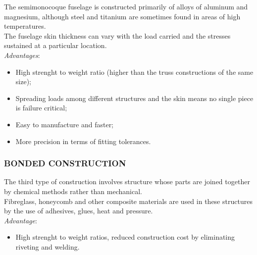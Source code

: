 \noindent 
The semimonocoque fuselage is constructed primarily of alloys of aluminum and magnesium, although steel and titanium are sometimes found in areas of high temperatures. \\ The fuselage skin thickness can vary with the
load carried and the stresses sustained at a particular location. \\

\smallskip
\noindent 
\emph{Advantages}: \begin{itemize}
	\item High strenght to weight ratio (higher than the truss constructions of the same size);
	\item Spreading loads among different structures and
	the skin means no single piece is failure critical;
	\item Easy to manufacture and faster;
	\item More precision in terms of fitting tolerances.
\end{itemize}

\bigskip
\noindent
 \subsubsection*{BONDED CONSTRUCTION}
 
\noindent The third type of construction involves structure whose parts are joined together by chemical methods rather than mechanical.\\ Fibreglass, honeycomb and other composite materials are used in these structures by the use of adhesives, glues, heat and pressure. \\

\smallskip
\noindent
\emph{Advantage}:
 \begin{itemize}
	\item High strenght to weight ratios, reduced construction cost by eliminating riveting and welding.
\end{itemize}



